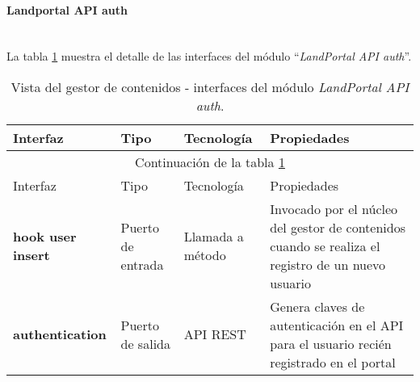 \paragraph{Landportal API auth} \hfill \\
La tabla \ref{interfaces_cms_landportal_api_auth} muestra el detalle de las interfaces del módulo ``\textit{LandPortal API auth}''.  

\begin{longtable}[c]{|p{25mm}|p{20mm}|p{30mm}|p{60mm}|}
	\caption{Vista del gestor de contenidos - interfaces del módulo \textit{LandPortal API auth}. \label{interfaces_cms_landportal_api_auth}}\\
		\hline
			Interfaz & Tipo & Tecnología & Propiedades\\
		\hline
		\hline
	\endfirsthead
		\hline
		\multicolumn{4}{|c|}{Continuación de la tabla \ref{interfaces_cms_landportal_api_auth}}\\
		\hline
			Interfaz & Tipo & Tecnología & Propiedades\\
		\hline
		\hline
	\endhead
	\hline
	\endfoot
		\textbf{hook user insert} & Puerto de entrada & Llamada a método & Invocado por el núcleo del gestor de contenidos cuando se realiza el registro de un nuevo usuario \\
		\hline
		\textbf{authentication} & Puerto de salida & API REST & Genera claves de autenticación en el API para el usuario recién registrado en el portal \\
	\hline
	\hline
\end{longtable}
